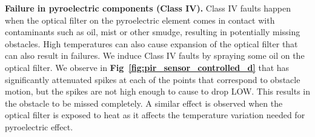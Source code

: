 


\textbf{Failure in pyroelectric components (Class IV).} Class IV faults happen when the optical filter on the pyroelectric element comes in contact with contaminants such as oil, mist or other smudge, resulting in potentially missing obstacles. High temperatures can also cause expansion of the optical filter that can also result in failures. 
We induce Class IV faults by spraying some oil on the optical filter. We observe in {\bfseries Fig~\ref{fig:pir_sensor_controlled_d}} that \aout has significantly attenuated spikes at each of the points that correspond to obstacle motion, but the spikes are not high enough to cause \cout to drop LOW. This results in the obstacle to be missed completely. A similar effect is observed when the optical filter is exposed to heat as it affects the temperature variation needed for pyroelectric effect.


